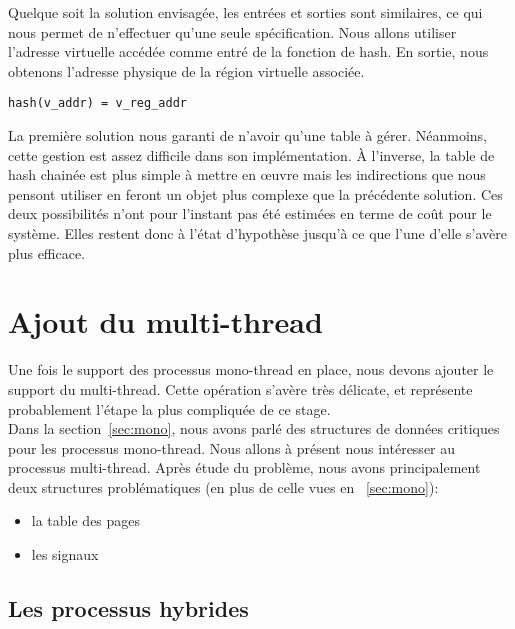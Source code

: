       Quelque soit la solution envisagée, les entrées et sorties sont
      similaires, ce qui nous permet de n'effectuer qu'une seule
      spécification. Nous allons utiliser l'adresse virtuelle accédée comme
      entré de la fonction de hash. En sortie, nous obtenons l'adresse physique
      de la région virtuelle associée.

      \begin{center}
        \texttt{hash(v\_addr) = v\_reg\_addr}
      \end{center}

      La première solution nous garanti de n'avoir qu'une table à
      gérer. Néanmoins, cette gestion est assez difficile dans son
      implémentation. À l'inverse, la table de hash chainée est plus simple à
      mettre en \oe uvre mais les indirections que nous pensont utiliser en
      feront un objet plus complexe que la précédente solution. Ces deux
      possibilités n'ont pour l'instant pas été estimées en terme de coût pour
      le système. Elles restent donc à l'état d'hypothèse jusqu'à ce que l'une
      d'elle s'avère plus efficace.


  \section{Ajout du multi-thread}
  \label{sec:multi}  

    Une fois le support des processus mono-thread en place, nous devons ajouter
    le support du multi-thread. Cette opération s'avère très délicate, et
    représente probablement l'étape la plus compliquée de ce stage.\\

    Dans la section~\ref{sec:mono}, nous avons parlé des structures de données
    critiques pour les processus mono-thread. Nous allons à présent nous
    intéresser au processus multi-thread. Après étude du problème, nous avons
    principalement deux structures problématiques (en plus de celle vues en
    ~\ref{sec:mono}):
    \begin{itemize}
      \item la table des pages
      \item les signaux
    \end{itemize}  

    \subsection{Les processus hybrides}

